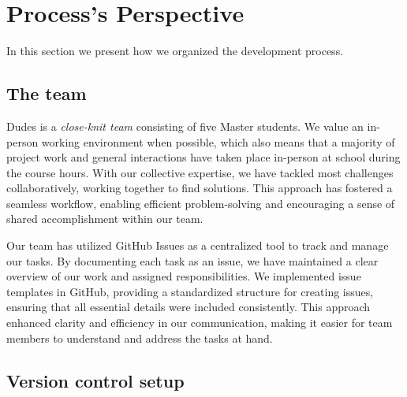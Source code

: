 \section{Process's Perspective} \label{sec:process}
In this section we present how we organized the development process.

\subsection{The team}
Dudes is a \textit{close-knit team} consisting of five Master students. We value an in-person working environment when possible, which also means that a majority of project work and general interactions have taken place in-person at school during the course hours. With our collective expertise, we have tackled most challenges collaboratively, working together to find solutions. This approach has fostered a seamless workflow, enabling efficient problem-solving and encouraging a sense of shared accomplishment within our team. 

Our team has utilized GitHub Issues as a centralized tool to track and manage our tasks. By documenting each task as an issue, we have maintained a clear overview of our work and assigned responsibilities. We implemented issue templates in GitHub, providing a standardized structure for creating issues, ensuring that all essential details were included consistently. This approach enhanced clarity and efficiency in our communication, making it easier for team members to understand and address the tasks at hand.

\subsection{Version control setup}

